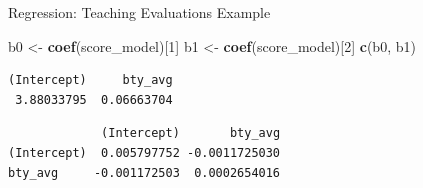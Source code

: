 \documentclass[
  ignorenonframetext,
]{beamer}
\newenvironment{Shaded}{\begin{snugshade}}{\end{snugshade}}
\newcommand{\DecValTok}[1]{\textcolor[rgb]{0.00,0.00,0.81}{#1}}
\newcommand{\FunctionTok}[1]{\textcolor[rgb]{0.13,0.29,0.53}{\textbf{#1}}}
\newcommand{\NormalTok}[1]{#1}
\newcommand{\OtherTok}[1]{\textcolor[rgb]{0.56,0.35,0.01}{#1}}
\newcommand{\SpecialCharTok}[1]{\textcolor[rgb]{0.81,0.36,0.00}{\textbf{#1}}}
\begin{document}
\begin{frame}[fragile]{Regression: Teaching Evaluations Example}
\label{regression-teaching-evaluations-example-10}
\normalsize

\begin{Shaded}
\begin{Highlighting}[]
\NormalTok{b0 }\OtherTok{\textless{}{-}} \FunctionTok{coef}\NormalTok{(score\_model)[}\DecValTok{1}\NormalTok{]}
\NormalTok{b1 }\OtherTok{\textless{}{-}} \FunctionTok{coef}\NormalTok{(score\_model)[}\DecValTok{2}\NormalTok{]}
\FunctionTok{c}\NormalTok{(b0, b1)}
\end{Highlighting}
\end{Shaded}

\begin{verbatim}
(Intercept)     bty_avg 
 3.88033795  0.06663704 
\end{verbatim}

\begin{Shaded}
\end{Shaded}

\begin{verbatim}
             (Intercept)       bty_avg
(Intercept)  0.005797752 -0.0011725030
bty_avg     -0.001172503  0.0002654016
\end{verbatim}

\normalsize
\end{frame}
\end{document}
